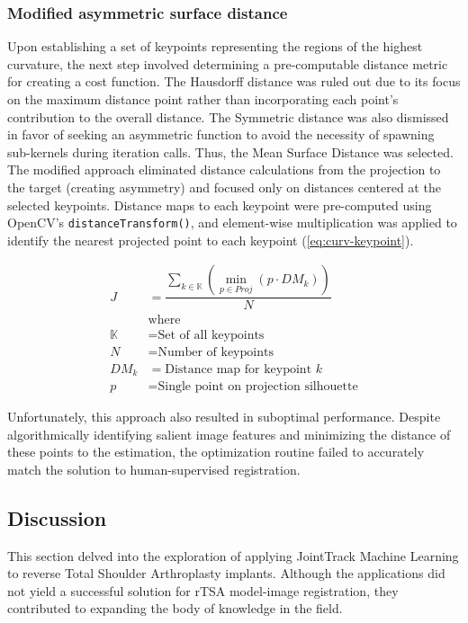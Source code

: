 \subsubsection{Modified asymmetric surface distance}
Upon establishing a set of keypoints representing the regions of the highest curvature, the next step involved determining a pre-computable distance metric for creating a cost function.
The Hausdorff distance was ruled out due to its focus on the maximum distance point rather than incorporating each point's contribution to the overall distance.
The Symmetric distance was also dismissed in favor of seeking an asymmetric function to avoid the necessity of spawning sub-kernels during iteration calls.
Thus, the Mean Surface Distance was selected.
The modified approach eliminated distance calculations from the projection to the target (creating asymmetry) and focused only on distances centered at the selected keypoints.
Distance maps to each keypoint were pre-computed using OpenCV's \texttt{distanceTransform()}, and element-wise multiplication was applied to identify the nearest projected point to each keypoint (\cref{eq:curv-keypoint}).

\begin{equation}
  \label{eq:curv-keypoint}
  \begin{split}
    \displaystyle J &= \dfrac{\sum_{k \in \mathbb{K}}(\min_{p\in Proj}(p \cdot DM_{k}))}{N} \\
      &\text{where}\\
    \mathbb{K} &= \text{Set of all keypoints} \\
    N &= \text{Number of keypoints} \\
    DM_{k} &= \text{Distance map for keypoint $k$} \\
    p &= \text{Single point on projection silhouette}
  \end{split}
\end{equation}

Unfortunately, this approach also resulted in suboptimal performance.
Despite algorithmically identifying salient image features and minimizing the distance of these points to the estimation, the optimization routine failed to accurately match the solution to human-supervised registration.

\subsection{Discussion}
This section delved into the exploration of applying JointTrack Machine Learning to reverse Total Shoulder Arthroplasty implants.
Although the applications did not yield a successful solution for rTSA model-image registration, they contributed to expanding the body of knowledge in the field.

